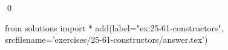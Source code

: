 
\begin{ex}
  \label{ex:25-61-constructors}
  
  \qed
\end{ex}
\begin{python0}
from solutions import *
add(label="ex:25-61-constructors",
    srcfilename='exercises/25-61-constructors/answer.tex')
\end{python0}
